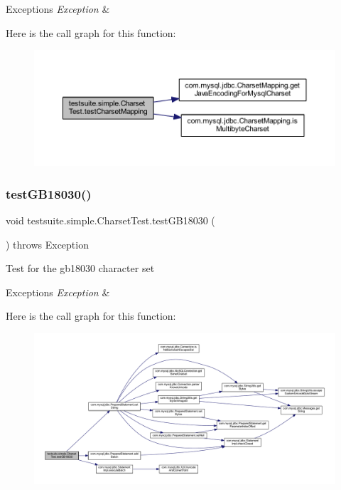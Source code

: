\begin{DoxyExceptions}{Exceptions}
{\em Exception} & \\
\hline
\end{DoxyExceptions}
Here is the call graph for this function\+:
\nopagebreak
\begin{figure}[H]
\begin{center}
\leavevmode
\includegraphics[width=350pt]{classtestsuite_1_1simple_1_1_charset_test_ace6046bed9bc3e29734e98003258fd58_cgraph}
\end{center}
\end{figure}
\mbox{\label{classtestsuite_1_1simple_1_1_charset_test_a6fa2cb7372e754c7a783af4cba1cbd17}} 
\subsubsection{\texorpdfstring{test\+G\+B18030()}{testGB18030()}}
{\footnotesize\ttfamily void testsuite.\+simple.\+Charset\+Test.\+test\+G\+B18030 (\begin{DoxyParamCaption}{ }\end{DoxyParamCaption}) throws Exception}

Test for the gb18030 character set


\begin{DoxyExceptions}{Exceptions}
{\em Exception} & \\
\hline
\end{DoxyExceptions}
Here is the call graph for this function\+:
\nopagebreak
\begin{figure}[H]
\begin{center}
\leavevmode
\includegraphics[width=350pt]{classtestsuite_1_1simple_1_1_charset_test_a6fa2cb7372e754c7a783af4cba1cbd17_cgraph}
\end{center}
\end{figure}


